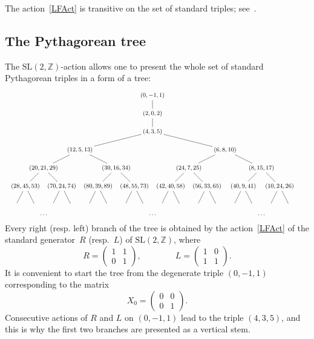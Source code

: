 \documentclass{article}[12pt]
\theoremstyle{plain}
\theoremstyle{definition}
\newcommand{\Z}{\mathbb{Z}}
\newcommand{\SL}{\mathrm{SL}}
\begin{document}
The action~\eqref{LFAct} is transitive on the set of standard triples; see~\cite{Tra}.

\subsection{The Pythagorean tree}

The $\SL(2,\Z)$-action allows one to present the whole set of standard Pythagorean triples
in a form of a tree:
$$
\begin{small}
\xymatrix @!0 @R=0.48cm @C=0.48cm
{
&&&&&&&&&&&&&&&&(0,-1,1)\ar@{-}[dd]&&\\
&&&&&&&&&&&&&&&&\\
&&&&&&&&&&&&&&&&(2,0,2)\ar@{-}[dd]&&\\
&&&&&&&&&&&&&&&&\\
&&&&&&&&&&&&&&&&(4,3,5)\ar@{-}[lllllllldd]\ar@{-}[rrrrrrrrdd]&&&&&&&&\\
&&&&&&&&&&&&&&&&\\
&&&&&&&&(12,5,13)\ar@{-}[lllldd]\ar@{-}[rrrrdd]
&&&&&&&&&&&&&&&&(6,8,10)\ar@{-}[lllldd]\ar@{-}[rrrrdd]&&&\\
&&&&&&&&&&&&&&&&&&&&&&&&\\
&&&&(20,21,29)\ar@{-}[lldd]\ar@{-}[rrdd]
&&&&&&&&(30,16,34)\ar@{-}[lldd]\ar@{-}[rrdd]
&&&&&&&&(24,7,25)\ar@{-}[lldd]\ar@{-}[rrdd]
&&&&&&&&(8,15,17)\ar@{-}[lldd]\ar@{-}[rrdd]\\
&&&&&&&&&&&&&&&&&&&&&&&&&&&&\\
&&(28,45,53)\ar@{-}[ldd]\ar@{-}[rdd]
&&&&(70,24,74)\ar@{-}[ldd]\ar@{-}[rdd]
&&&&(80,39,89)\ar@{-}[ldd]\ar@{-}[rdd]
&&&&(48,55,73)\ar@{-}[ldd]\ar@{-}[rdd]
&&&&(42,40,58)\ar@{-}[ldd]\ar@{-}[rdd]
&&&&(56,33,65)\ar@{-}[ldd]\ar@{-}[rdd]
&&&&(40,9,41)\ar@{-}[ldd]\ar@{-}[rdd]
&&&&(10,24,26)\ar@{-}[ldd]\ar@{-}[rdd]\\
&&&&&&&&&&&&&&&&&&&&&&
&&&&&&&&&&&\\
&&
&&&&
&&&&
&&&&
&&&&
&&&&
&&&&
&&&&&&\\
&&&&\ldots&&&&&&&&&&&&\ldots&&&&&&&&&&&&\ldots
}
\end{small}$$
Every right (resp. left) branch of the tree is obtained by the action~\eqref{LFAct} of the
standard generator~$R$ (resp.~$L$)
of $\SL(2,\Z)$, where
$$
R=
\begin{pmatrix}
1&1\\
0&1
\end{pmatrix},
\qquad\qquad
L=
\begin{pmatrix}
1&0\\
1&1
\end{pmatrix}.
$$
It is convenient to start the tree from the degenerate triple $(0,-1,1)$ corresponding to the matrix
\begin{equation}
\label{X0}
X_0=
\begin{pmatrix}
0&0\\%
0&1
\end{pmatrix}.
\end{equation}
Consecutive actions of $R$ and $L$ on $(0,-1,1)$ 
lead to the triple $(4,3,5)$, and this is why the first two branches are presented as a vertical stem.
\end{document}
